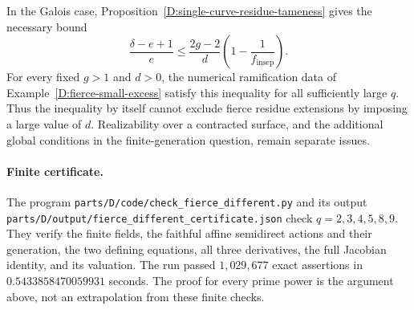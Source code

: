 \begin{remark}
In the Galois case, Proposition~\ref{D:single-curve-residue-tameness}
gives the necessary bound
\[
 \frac{\delta-e+1}{e}
   \leq\frac{2g-2}{d}\left(1-\frac1{f_{\mathrm{insep}}}\right).
\]
For every fixed $g>1$ and $d>0$, the numerical ramification data of
Example~\ref{D:fierce-small-excess} satisfy this inequality for all
sufficiently large $q$.  Thus the inequality by itself cannot exclude
fierce residue extensions by imposing a large value of $d$.
Realizability over a contracted surface, and the additional global
conditions in the finite-generation question, remain separate issues.
\end{remark}

\paragraph{Finite certificate.}
The program \nolinkurl{parts/D/code/check_fierce_different.py} and its
output \nolinkurl{parts/D/output/fierce_different_certificate.json}
check $q=2,3,4,5,8,9$.  They verify the finite fields, the faithful affine
semidirect actions and their generation, the two defining equations, all
three derivatives, the full Jacobian identity, and its valuation.
The run passed $1{,}029{,}677$ exact assertions in
$0.5433858470059931$ seconds.  The proof for every prime power is the argument
above, not an extrapolation from these finite checks.
